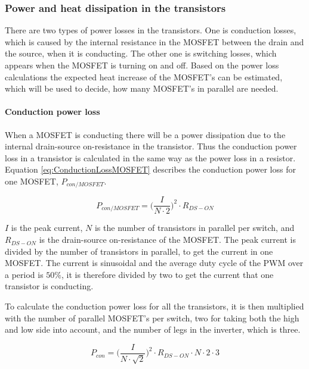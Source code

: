 \subsubsection{Power and heat dissipation in the transistors}
There are two types of power losses in the transistors. One is conduction losses, which is caused by the internal resistance in the MOSFET between the drain and the source, when it is conducting. The other one is switching losses, which appears when the MOSFET is turning on and off. Based on the power loss calculations the expected heat increase of the MOSFET's can be estimated, which will be used to decide, how many MOSFET's in parallel are needed.

\paragraph{Conduction power loss}
When a MOSFET is conducting there will be a power dissipation due to the internal drain-source on-resistance in the transistor. Thus the conduction power loss in a transistor is calculated in the same way as the power loss in a resistor. Equation \ref{eq:ConductionLossMOSFET} describes the conduction power loss for one MOSFET, $P_{con/MOSFET}$.

    \begin{equation}
        P_{con/MOSFET} = \bigg( \frac{I}{N \cdot 2} \bigg) ^2 \cdot R_{DS-ON}
        \label{eq:ConductionLossMOSFET}
    \end{equation}

$I$ is the peak current, $N$ is the number of transistors in parallel per switch, and $R_{DS-ON}$ is the drain-source on-resistance of the MOSFET.
The peak current is divided by the number of transistors in parallel, to get the current in one MOSFET. The current is sinusoidal and the average duty cycle of the PWM over a period is $50 \% $, it is therefore divided by two to get the current that one transistor is conducting.

To calculate the conduction power loss for all the transistors, it is then multiplied with the number of parallel MOSFET's per switch, two for taking both the high and low side into account, and the number of legs in the inverter, which is three.

    \begin{equation}
        P_{con} = \bigg( \frac{I}{N \cdot \sqrt{2}} \bigg) ^2 \cdot R_{DS-ON} \cdot N \cdot 2 \cdot 3
        \label{eq:ConductionLossTot}
    \end{equation}

